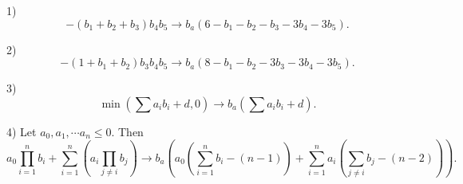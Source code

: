 \documentclass[11pt]{scrartcl}
\begin{document}
\author{} 
\date{SEP 2019}

1)\[-(b_1 + b_2 + b_3) b_4 b_5 \longrightarrow  b_a(6 -b_1 -b_2 -b_3 -3b_4 -3b_5). \]

2)\[-(1+b_1 + b_2) b_3 b_4 b_5 \longrightarrow b_a(8-b_1 - b_2 - 3b_3 -3b_4 -3b_5). \]
 
3) \[\min \left ( \sum a_i b_i + d, 0\right) \longrightarrow b_a\left(\sum a_i b_i + d \right). \] 

4) Let $a_0, a_1, \cdots a_n \le 0$. Then \[ a_0 \prod_{i = 1}^n b_i + \sum_{i = 1}^n \left( a_i \prod_{j \neq i} b_j\right) \longrightarrow  b_a \left(a_0\left(\sum_{i=1}^n b_i - (n-1)\right) + \sum_{i=1}^n a_i \left( \sum_{j \neq i} b_j - (n-2)\right) \right). \]
\end{document}

